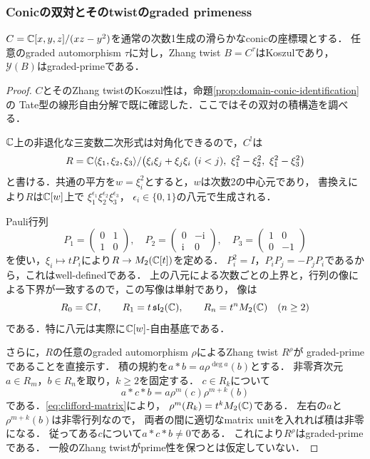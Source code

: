 \documentclass[11pt,a4paper]{ltjsarticle}
\begin{document}
\subsubsection{Conicの双対とそのtwistのgraded primeness}

\begin{lemma}[conicのKoszul双対]
\label{lem:conic-dual-prime}
$C=\mathbb C[x,y,z]/(xz-y^2)$を通常の次数1生成の滑らかなconicの座標環とする．
任意のgraded automorphism $\tau$に対し，Zhang twist $B=C^\tau$はKoszulであり，
$\mathcal Y(B)$はgraded-primeである．
\end{lemma}

\begin{proof}
$C$とそのZhang twistのKoszul性は，命題\ref{prop:domain-conic-identification}の
Tate型の線形自由分解で既に確認した．ここではその双対の積構造を調べる．

$\mathbb C$上の非退化な三変数二次形式は対角化できるので，$C^!$は
\[
 R=\mathbb C\langle\xi_1,\xi_2,\xi_3\rangle/
 \bigl(\xi_i\xi_j+\xi_j\xi_i\ (i<j),\
 \xi_1^2-\xi_2^2,\ \xi_1^2-\xi_3^2\bigr)
\]
と書ける．共通の平方を$w=\xi_i^2$とすると，$w$は次数2の中心元であり，
書換えにより$R$は$\mathbb C[w]$上で
$\xi_1^{\epsilon_1}\xi_2^{\epsilon_2}\xi_3^{\epsilon_3}$，
$\epsilon_i\in\{0,1\}$の八元で生成される．

Pauli行列
\[
 P_1=\begin{pmatrix}0&1\\1&0\end{pmatrix},\quad
 P_2=\begin{pmatrix}0&-\mathrm i\\\mathrm i&0\end{pmatrix},\quad
 P_3=\begin{pmatrix}1&0\\0&-1\end{pmatrix}
\]
を使い，$\xi_i\mapsto tP_i$により$R\to M_2(\mathbb C[t])$を定める．
$P_i^2=I$，$P_iP_j=-P_jP_i$であるから，これはwell-definedである．
上の八元による次数ごとの上界と，行列の像による下界が一致するので，この写像は単射であり，
像は
\begin{equation}
\label{eq:clifford-matrix}
 R_0=\mathbb C I,\qquad R_1=t\,\mathfrak{sl}_2(\mathbb C),\qquad
 R_n=t^nM_2(\mathbb C)\quad(n\geq2)
\end{equation}
である．特に八元は実際に$\mathbb C[w]$-自由基底である．

さらに，$R$の任意のgraded automorphism $\rho$によるZhang twist $R^\rho$が
graded-primeであることを直接示す．
積の規約を$a*b=a\rho^{\deg a}(b)$とする．
非零斉次元$a\in R_m$，$b\in R_n$を取り，$k\geq2$を固定する．
$c\in R_k$について
\[
 a*c*b=a\rho^m(c)\rho^{m+k}(b)
\]
である．\eqref{eq:clifford-matrix}により，
$\rho^m(R_k)=t^kM_2(\mathbb C)$である．
左右の$a$と$\rho^{m+k}(b)$は非零行列なので，
両者の間に適切なmatrix unitを入れれば積は非零になる．
従ってある$c$について$a*c*b\ne0$である．
これにより$R^\rho$はgraded-primeである．
一般のZhang twistがprime性を保つとは仮定していない．


\end{proof}
\end{document}
